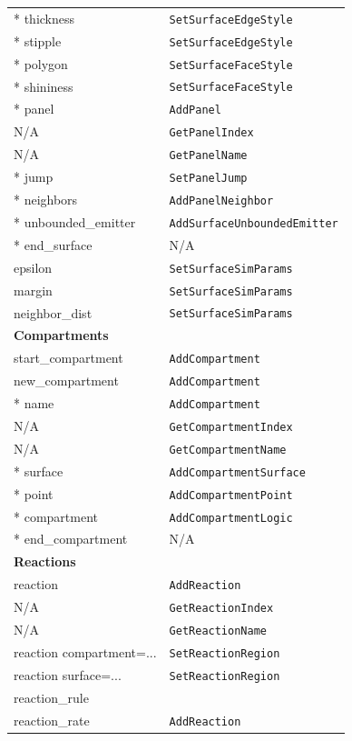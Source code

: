 \documentclass {scrbook}
\newcommand {\ttt} {\texttt}
\begin{document}
\begin{longtable}[c]{ll}
{*} thickness & \ttt{SetSurfaceEdgeStyle}\\
{*} stipple & \ttt{SetSurfaceEdgeStyle}\\
{*} polygon & \ttt{SetSurfaceFaceStyle}\\
{*} shininess & \ttt{SetSurfaceFaceStyle}\\
{*} panel & \ttt{AddPanel}\\
N/A & \ttt{GetPanelIndex}\\
N/A & \ttt{GetPanelName}\\
{*} jump & \ttt{SetPanelJump}\\
{*} neighbors & \ttt{AddPanelNeighbor}\\
{*} unbounded\_emitter & \ttt{AddSurfaceUnboundedEmitter}\\
{*} end\_surface & N/A\\
epsilon & \ttt{SetSurfaceSimParams}\\
margin & \ttt{SetSurfaceSimParams}\\
neighbor\_dist & \ttt{SetSurfaceSimParams}\\
\hline
\multicolumn{2}{l}{\hspace{0.3in}\textbf{Compartments}}\\
\hline
start\_compartment & \ttt{AddCompartment}\\
new\_compartment & \ttt{AddCompartment}\\
{*} name & \ttt{AddCompartment}\\
N/A & \ttt{GetCompartmentIndex}\\
N/A & \ttt{GetCompartmentName}\\
{*} surface & \ttt{AddCompartmentSurface}\\
{*} point & \ttt{AddCompartmentPoint}\\
{*} compartment & \ttt{AddCompartmentLogic}\\
{*} end\_compartment & N/A\\
\hline
\multicolumn{2}{l}{\hspace{0.3in}\textbf{Reactions}}\\
\hline
reaction & \ttt{AddReaction}\\
N/A & \ttt{GetReactionIndex}\\
N/A & \ttt{GetReactionName}\\
reaction compartment=... & \ttt{SetReactionRegion}\\
reaction surface=... & \ttt{SetReactionRegion}\\
reaction\_rule \\ %
reaction\_rate & \ttt{AddReaction}\\

\end{longtable}
\end{document}
